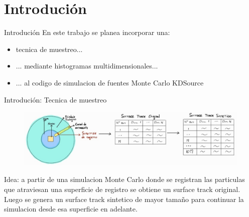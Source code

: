 \documentclass[aspectratio=169,english]{beamer}
\begin{document}







\section{Introdución}
\begin{frame}{Introdución}
    En este trabajo se planea incorporar una:
    \begin{itemize}
        \item tecnica de muestreo...
        \item ... mediante histogramas multidimensionales...
        \item ... al codigo de simulacion de fuentes Monte Carlo KDSource
    \end{itemize}
\end{frame}

\begin{frame}{Introdución: Tecnica de muestreo}
    \begin{figure}
        \centering
        \includegraphics[width=1\linewidth]{imagens/esquema1.jpeg}
        \label{fig:esquema1}
    \end{figure}

    Idea: a partir de una simulacion Monte Carlo donde se registran las particulas que atraviesan una superficie
    de registro se obtiene un surface track original. Luego se genera un surface track sintetico de mayor tamaño 
    para continuar la simulacion desde esa superficie en adelante.
\end{frame}
\end{document}
